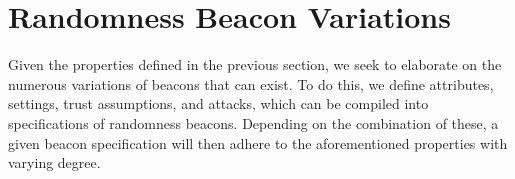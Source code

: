 \section{Randomness Beacon Variations}\label{sec:randomnessbeaconvariations}
Given the properties defined in the previous section, we seek to elaborate on the numerous variations of beacons that can exist.
To do this, we define attributes, settings, trust assumptions, and attacks, which can be compiled into specifications of randomness beacons.
Depending on the combination of these, a given beacon specification will then adhere to the aforementioned properties with varying degree.
